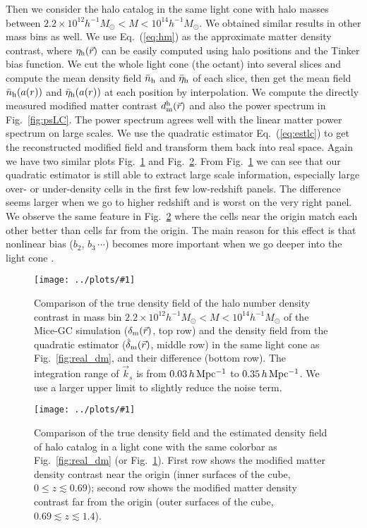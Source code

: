 \documentclass[prd,amsmath,amssymb,floatfix,superscriptaddress,nofootinbib,twocolumn]{revtex4-1}
\newcommand{\vrr}{\vec{r}}
\newcommand{\vk}{\vec{k}}
\newcommand{\ec}[1]{Eq.~(\ref{eq:#1})}
\newcommand{\rf}[1]{\ref{fig:#1}}
\newcommand{\sfig}[2]{
\texttt{[image: ../plots/\#1]}
        }
\newcommand{\Sfig}[2]{
   \begin{figure}[thbp]
   \begin{center}
    \sfig{../plots/#1.pdf}{\columnwidth}
    \caption{{\small #2}}
    \label{fig:#1}
     \end{center}
   \end{figure}
}
\begin{document}
Then we consider the halo catalog in the same light cone with halo masses between $2.2 \times 10^{12}h^{-1}M_{\odot}<M < 10^{14}h^{-1}M_{\odot}$. We obtained similar results in other mass bins as well. We use \ec{hm} as the approximate matter density contrast, where $\eta_{\rm h}(\vrr)$ can be easily computed using halo positions and the Tinker bias function. We cut the whole light cone (the octant) into several slices and compute the mean density field $\bar{{n}}_{\rm h}$ and $\bar{\eta}_{\rm h}$ of each slice, then get the mean field  $\bar{{n}}_{\rm h}(a(r))$ and $\bar{\eta}_{\rm h}(a(r))$ at each position by interpolation. We compute the directly measured modified matter contrast $d_{\rm m}^{\rm h}(\vrr)$ and also the power spectrum in Fig.~\rf{psLC}. The power spectrum agrees well with the linear matter power spectrum on large scales. We use the quadratic estimator \ec{estlc} to get the reconstructed modified field and transform them back into real space. Again we have two similar plots Fig.~\rf{real_halo} and Fig.~\rf{cube_halo}. From Fig.~\rf{real_halo} we can see that our quadratic estimator is still able to extract large scale information, especially large over- or under-density cells in the first few low-redshift panels. The difference seems larger when we go to higher redshift and is worst on the very right panel. We observe the same feature in Fig.~\rf{cube_halo} where the cells near the origin match each other better than cells far from the origin. The main reason for this effect is that nonlinear bias ($b_{2}$, $b_{3}\,\cdots$) becomes more important when we go deeper into the light cone \cite{Lazeyras:2016nbs}.

\Sfig{real_halo}{Comparison of the true density field of the halo number density contrast in mass bin $2.2 \times 10^{12}h^{-1}M_{\odot}<M < 10^{14}h^{-1}M_{\odot}$ of the Mice-GC simulation ($\delta_{\rm m}(\vrr)$, top row) and the density field from the quadratic estimator ($\hat{\delta}_{\rm m}(\vrr)$, middle row) in the same light cone as Fig.~\rf{real_dm}, and their difference (bottom row). The integration range of $\vk_{s}$ is from $0.03\, h \rm \, Mpc^{-1}$ to $0.35\, h \rm \, Mpc^{-1}$. We use a larger upper limit to slightly reduce the noise term.} 
\Sfig{cube_halo}{Comparison of the true density field and the estimated density field of halo catalog in a light cone with the same colorbar as Fig.~\rf{real_dm} (or Fig.~\rf{real_halo}). First row shows the modified matter density contrast near the origin (inner surfaces of the cube, $0\leqslant z \lesssim 0.69$); second row shows the modified matter density contrast far from the origin (outer surfaces of the cube, $0.69\lesssim z \lesssim 1.4$).}
\end{document}
